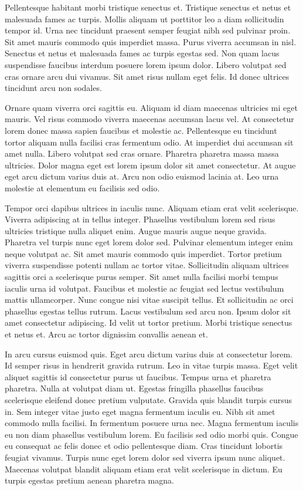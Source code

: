 \documentclass[12pt,ngerman,a4paper,oneside,,tablecaptionabove]{scrbook}
\begin{document}
Pellentesque habitant morbi tristique senectus et. Tristique senectus et
netus et malesuada fames ac turpis. Mollis aliquam ut porttitor leo a
diam sollicitudin tempor id. Urna nec tincidunt praesent semper feugiat
nibh sed pulvinar proin. Sit amet mauris commodo quis imperdiet massa.
Purus viverra accumsan in nisl. Senectus et netus et malesuada fames ac
turpis egestas sed. Non quam lacus suspendisse faucibus interdum posuere
lorem ipsum dolor. Libero volutpat sed cras ornare arcu dui vivamus. Sit
amet risus nullam eget felis. Id donec ultrices tincidunt arcu non
sodales.

Ornare quam viverra orci sagittis eu. Aliquam id diam maecenas ultricies
mi eget mauris. Vel risus commodo viverra maecenas accumsan lacus vel.
At consectetur lorem donec massa sapien faucibus et molestie ac.
Pellentesque eu tincidunt tortor aliquam nulla facilisi cras fermentum
odio. At imperdiet dui accumsan sit amet nulla. Libero volutpat sed cras
ornare. Pharetra pharetra massa massa ultricies. Dolor magna eget est
lorem ipsum dolor sit amet consectetur. At augue eget arcu dictum varius
duis at. Arcu non odio euismod lacinia at. Leo urna molestie at
elementum eu facilisis sed odio.

Tempor orci dapibus ultrices in iaculis nunc. Aliquam etiam erat velit
scelerisque. Viverra adipiscing at in tellus integer. Phasellus
vestibulum lorem sed risus ultricies tristique nulla aliquet enim. Augue
mauris augue neque gravida. Pharetra vel turpis nunc eget lorem dolor
sed. Pulvinar elementum integer enim neque volutpat ac. Sit amet mauris
commodo quis imperdiet. Tortor pretium viverra suspendisse potenti
nullam ac tortor vitae. Sollicitudin aliquam ultrices sagittis orci a
scelerisque purus semper. Sit amet nulla facilisi morbi tempus iaculis
urna id volutpat. Faucibus et molestie ac feugiat sed lectus vestibulum
mattis ullamcorper. Nunc congue nisi vitae suscipit tellus. Et
sollicitudin ac orci phasellus egestas tellus rutrum. Lacus vestibulum
sed arcu non. Ipsum dolor sit amet consectetur adipiscing. Id velit ut
tortor pretium. Morbi tristique senectus et netus et. Arcu ac tortor
dignissim convallis aenean et.

In arcu cursus euismod quis. Eget arcu dictum varius duis at consectetur
lorem. Id semper risus in hendrerit gravida rutrum. Leo in vitae turpis
massa. Eget velit aliquet sagittis id consectetur purus ut faucibus.
Tempus urna et pharetra pharetra. Nulla at volutpat diam ut. Egestas
fringilla phasellus faucibus scelerisque eleifend donec pretium
vulputate. Gravida quis blandit turpis cursus in. Sem integer vitae
justo eget magna fermentum iaculis eu. Nibh sit amet commodo nulla
facilisi. In fermentum posuere urna nec. Magna fermentum iaculis eu non
diam phasellus vestibulum lorem. Eu facilisis sed odio morbi quis.
Congue eu consequat ac felis donec et odio pellentesque diam. Cras
tincidunt lobortis feugiat vivamus. Turpis nunc eget lorem dolor sed
viverra ipsum nunc aliquet. Maecenas volutpat blandit aliquam etiam erat
velit scelerisque in dictum. Eu turpis egestas pretium aenean pharetra
magna.
\end{document}
